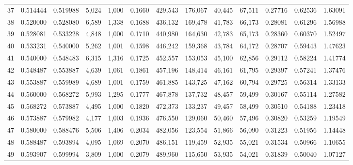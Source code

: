 \begin{tabular}{rrrrrrrrrrrrr}
37 &  0.514444 &  0.519988 &   5,024 &  1,000 &                                     0.1660 &  429,543 &  176,067 &   40,445 &   67,511 &  0.27716 &  0.62536 &  1.63091 \\
38 &  0.520000 &  0.528080 &   6,589 &  1,338 &                                     0.1688 &  436,132 &  169,478 &   41,783 &   66,173 &  0.28081 &  0.61296 &  1.56988 \\
39 &  0.528081 &  0.533228 &   4,848 &  1,000 &                                     0.1710 &  440,980 &  164,630 &   42,783 &   65,173 &  0.28360 &  0.60370 &  1.52497 \\
40 &  0.533231 &  0.540000 &   5,262 &  1,001 &                                     0.1598 &  446,242 &  159,368 &   43,784 &   64,172 &  0.28707 &  0.59443 &  1.47623 \\
41 &  0.540000 &  0.548483 &   6,315 &  1,316 &                                     0.1725 &  452,557 &  153,053 &   45,100 &   62,856 &  0.29112 &  0.58224 &  1.41774 \\
42 &  0.548487 &  0.553887 &   4,639 &  1,061 &                                     0.1861 &  457,196 &  148,414 &   46,161 &   61,795 &  0.29397 &  0.57241 &  1.37476 \\
43 &  0.553887 &  0.559989 &   4,689 &  1,001 &                                     0.1759 &  461,885 &  143,725 &   47,162 &   60,794 &  0.29725 &  0.56314 &  1.33133 \\
44 &  0.560000 &  0.568272 &   5,993 &  1,295 &                                     0.1777 &  467,878 &  137,732 &   48,457 &   59,499 &  0.30167 &  0.55114 &  1.27582 \\
45 &  0.568272 &  0.573887 &   4,495 &  1,000 &                                     0.1820 &  472,373 &  133,237 &   49,457 &   58,499 &  0.30510 &  0.54188 &  1.23418 \\
46 &  0.573887 &  0.579982 &   4,177 &  1,003 &                                     0.1936 &  476,550 &  129,060 &   50,460 &   57,496 &  0.30820 &  0.53259 &  1.19549 \\
47 &  0.580000 &  0.588476 &   5,506 &  1,406 &                                     0.2034 &  482,056 &  123,554 &   51,866 &   56,090 &  0.31223 &  0.51956 &  1.14448 \\
48 &  0.588487 &  0.593894 &   4,095 &  1,069 &                                     0.2070 &  486,151 &  119,459 &   52,935 &   55,021 &  0.31534 &  0.50966 &  1.10655 \\
49 &  0.593907 &  0.599994 &   3,809 &  1,000 &                                     0.2079 &  489,960 &  115,650 &   53,935 &   54,021 &  0.31839 &  0.50040 &  1.07127 \\

\end{tabular}
